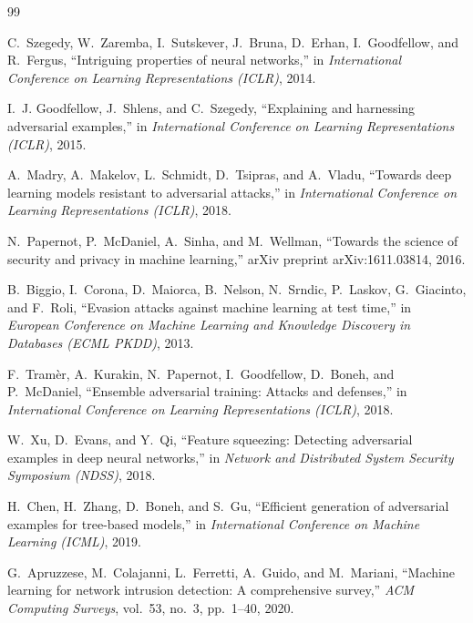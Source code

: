 \documentclass[12pt,a4paper,oneside]{report}
\begin{document}
\begin{thebibliography}{99}

C.~Szegedy, W.~Zaremba, I.~Sutskever, J.~Bruna, D.~Erhan, I.~Goodfellow, and R.~Fergus,
``Intriguing properties of neural networks,'' in \textit{International Conference on Learning Representations (ICLR)}, 2014.

I.~J. Goodfellow, J.~Shlens, and C.~Szegedy,
``Explaining and harnessing adversarial examples,'' in \textit{International Conference on Learning Representations (ICLR)}, 2015.

A.~Madry, A.~Makelov, L.~Schmidt, D.~Tsipras, and A.~Vladu,
``Towards deep learning models resistant to adversarial attacks,'' in \textit{International Conference on Learning Representations (ICLR)}, 2018.

N.~Papernot, P.~McDaniel, A.~Sinha, and M.~Wellman,
``Towards the science of security and privacy in machine learning,'' arXiv preprint arXiv:1611.03814, 2016.

B.~Biggio, I.~Corona, D.~Maiorca, B.~Nelson, N.~Srndic, P.~Laskov, G.~Giacinto, and F.~Roli,
``Evasion attacks against machine learning at test time,'' in \textit{European Conference on Machine Learning and Knowledge Discovery in Databases (ECML PKDD)}, 2013.

F.~Tram\`er, A.~Kurakin, N.~Papernot, I.~Goodfellow, D.~Boneh, and P.~McDaniel,
``Ensemble adversarial training: Attacks and defenses,'' in \textit{International Conference on Learning Representations (ICLR)}, 2018.

W.~Xu, D.~Evans, and Y.~Qi,
``Feature squeezing: Detecting adversarial examples in deep neural networks,'' in \textit{Network and Distributed System Security Symposium (NDSS)}, 2018.

H.~Chen, H.~Zhang, D.~Boneh, and S.~Gu,
``Efficient generation of adversarial examples for tree-based models,'' in \textit{International Conference on Machine Learning (ICML)}, 2019.

G.~Apruzzese, M.~Colajanni, L.~Ferretti, A.~Guido, and M.~Mariani,
``Machine learning for network intrusion detection: A comprehensive survey,'' \textit{ACM Computing Surveys}, vol.~53, no.~3, pp.~1--40, 2020.


\end{thebibliography}
\end{document}
